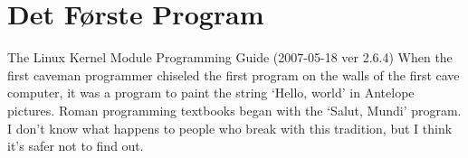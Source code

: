 \chapter{Det Første Program}
\label{sec:first}

\begin{inspiration}{The Linux Kernel Module Programming Guide (2007-05-18 ver 2.6.4)}
When the first caveman programmer chiseled the first program on the walls of the first cave computer, it was a program to paint the string `Hello, world' in Antelope pictures. Roman programming textbooks began with the `Salut, Mundi' program. I don't know what happens to people who break with this tradition, but I think it's safer not to find out.
\end{inspiration}


